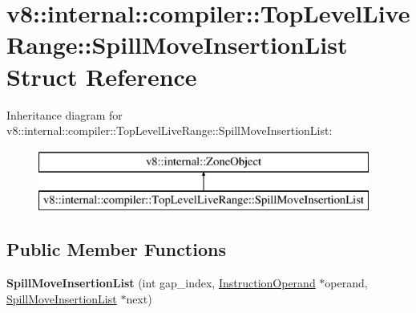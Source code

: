 \hypertarget{structv8_1_1internal_1_1compiler_1_1_top_level_live_range_1_1_spill_move_insertion_list}{}\section{v8\+:\+:internal\+:\+:compiler\+:\+:Top\+Level\+Live\+Range\+:\+:Spill\+Move\+Insertion\+List Struct Reference}
\label{structv8_1_1internal_1_1compiler_1_1_top_level_live_range_1_1_spill_move_insertion_list}
Inheritance diagram for v8\+:\+:internal\+:\+:compiler\+:\+:Top\+Level\+Live\+Range\+:\+:Spill\+Move\+Insertion\+List\+:\begin{figure}[H]
\begin{center}
\leavevmode
\includegraphics[height=2.000000cm]{structv8_1_1internal_1_1compiler_1_1_top_level_live_range_1_1_spill_move_insertion_list}
\end{center}
\end{figure}
\subsection*{Public Member Functions}
\begin{DoxyCompactItemize}
\item 
{\bfseries Spill\+Move\+Insertion\+List} (int gap\+\_\+index, \hyperlink{classv8_1_1internal_1_1compiler_1_1_instruction_operand}{Instruction\+Operand} $\ast$operand, \hyperlink{structv8_1_1internal_1_1compiler_1_1_top_level_live_range_1_1_spill_move_insertion_list}{Spill\+Move\+Insertion\+List} $\ast$next)\hypertarget{structv8_1_1internal_1_1compiler_1_1_top_level_live_range_1_1_spill_move_insertion_list_a7343b7c347ce74fcaf32ccb3e6d2c35d}{}\label{structv8_1_1internal_1_1compiler_1_1_top_level_live_range_1_1_spill_move_insertion_list_a7343b7c347ce74fcaf32ccb3e6d2c35d}

\end{DoxyCompactItemize}

